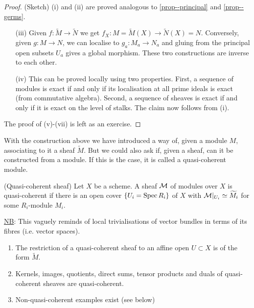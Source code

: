 \documentclass[a4paper,11pt]{article}
\begin{document}
			\begin{proof}\renewcommand{\qedsymbol}{}
				(Sketch) (i) and (ii) are proved analogous to \autoref{prop--principal} and \ref{prop--germs}.
				\begin{enumerate}
					\item[(iii)] Given $f:\widetilde{M}\rightarrow\widetilde{N}$ we get $f_X:M=\widetilde{M}(X)\rightarrow\widetilde{N}(X)=N$. Conversely, given $g:M\rightarrow N$, we can localise to $g_a:M_a\rightarrow N_a$ and gluing from the principal open subsets $U_a$ gives a global morphism. These two constructions are inverse to each other.
					\item[(iv)] This can be proved locally using two properties. First, a sequence of modules is exact if and only if its localisation at all prime ideals is exact (from commutative algebra). Second, a sequence of sheaves is exact if and only if it is exact on the level of stalks. The claim now follows from (i). 
				\end{enumerate}
				The proof of (v)-(vii) is left as an exercise.
			\end{proof}\renewcommand{\qedsymbol}{$\square$}
			
			With the construction above we have introduced a way of, given a module $M$, associating to it a sheaf $\widetilde{M}$. But we could also ask if, given a sheaf, can it be constructed from a module. If this is the case, it is called a quasi-coherent module.

			\begin{defi}
				(Quasi-coherent sheaf) Let $X$ be a scheme. A sheaf $\mathcal{M}$ of modules over $X$ is quasi-coherent if there is an open cover $\{U_i=\operatorname{Spec} R_i\}$ of $X$ with $\mathcal{M}|_{U_i}\simeq\widetilde{M}_i$ for some $R_i$-module $M_i$.
			\end{defi}

			\noindent\underline{NB}: This vaguely reminds of local trivialisations of vector bundles in terms of its fibres (i.e. vector spaces).

			\begin{remark}
				\begin{enumerate}
					\item The restriction of a quasi-coherent sheaf to an affine open $U\subset X$ is of the form $\widetilde{M}$.
					\item Kernels, images, quotients, direct sums, tensor products and duals of quasi-coherent sheaves are quasi-coherent.
					\item Non-quasi-coherent examples exist (see below)
				\end{enumerate}
			\end{remark}
\end{document}
